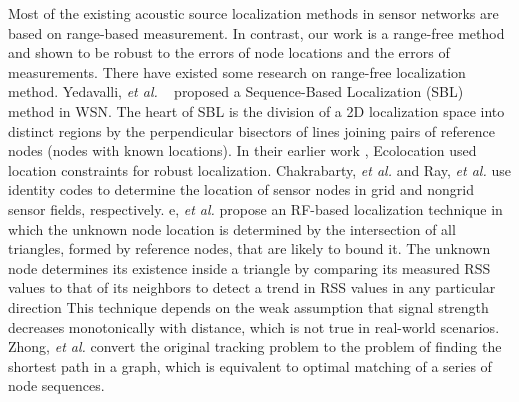 Most of the existing acoustic source localization methods in sensor networks are based on range-based measurement.
In contrast, our work is a range-free method and shown to be robust to the errors of node locations and the errors of measurements.
There have existed some research on range-free localization method.
Yedavalli, \emph{et al.} ~\cite{yedavalli2008sequence} proposed a Sequence-Based Localization (SBL) method in WSN. 
The heart of SBL is the division of a 2D localization space into distinct regions by the perpendicular bisectors of lines joining pairs of reference nodes (nodes with known locations).
In their earlier work \cite{yedavalli2005ecolocation}, Ecolocation used location constraints for robust localization.
Chakrabarty, \emph{et al.} \cite{chakrabarty2002grid} and Ray, \emph{et al.} \cite{ray2004robust} use identity codes to determine the location of sensor nodes in grid and nongrid sensor fields, respectively. 
e, \emph{et al.} \cite{he2003range} propose an RF-based localization technique in which the unknown node location is determined by the intersection of all triangles,
formed by reference nodes, that are likely to bound it. The unknown node determines its existence inside a triangle by
comparing its measured RSS values to that of its neighbors to detect a trend in RSS values in any particular direction
This technique depends on the weak assumption that signal strength decreases monotonically with distance, which is not true in real-world scenarios.
Zhong, \emph{et al.} \cite{zhong2009tracking} convert the original tracking problem to the problem of finding the shortest path in a graph, which is equivalent to optimal matching of a series of node sequences. 

